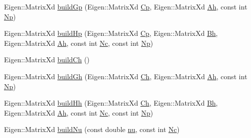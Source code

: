 \begin{DoxyCompactItemize}
\item 
\-Eigen\-::\-Matrix\-Xd \hyperlink{classZmpPreviewController_a6b61c5f7bcda6b8df027771a8e43ea8b}{build\-Gp} (\-Eigen\-::\-Matrix\-Xd \hyperlink{classZmpPreviewController_a1a63870dcc3d51a26c4adc9c97e650ff}{\-Cp}, \-Eigen\-::\-Matrix\-Xd \hyperlink{classZmpPreviewController_a8ee8ec415e25374f4fa687f5a5a6b9df}{\-Ah}, const int \hyperlink{classZmpPreviewController_a2de373daf73b4c28f4b6387787bd27e2}{\-Np})
\item 
\-Eigen\-::\-Matrix\-Xd \hyperlink{classZmpPreviewController_a32aeeb35ac5733702fba52df05fdf61d}{build\-Hp} (\-Eigen\-::\-Matrix\-Xd \hyperlink{classZmpPreviewController_a1a63870dcc3d51a26c4adc9c97e650ff}{\-Cp}, \-Eigen\-::\-Matrix\-Xd \hyperlink{classZmpPreviewController_a98bd07d03d0a6004b345ef4310cf17b6}{\-Bh}, \-Eigen\-::\-Matrix\-Xd \hyperlink{classZmpPreviewController_a8ee8ec415e25374f4fa687f5a5a6b9df}{\-Ah}, const int \hyperlink{classZmpPreviewController_af0c8b4aa92a6e3e95f80d81a8c91f693}{\-Nc}, const int \hyperlink{classZmpPreviewController_a2de373daf73b4c28f4b6387787bd27e2}{\-Np})
\item 
\-Eigen\-::\-Matrix\-Xd \hyperlink{classZmpPreviewController_a58723464a66fc3a1122c613500bb2052}{build\-Ch} ()
\item 
\-Eigen\-::\-Matrix\-Xd \hyperlink{classZmpPreviewController_a877b1d91bdf6767d8be83ef2a67fedde}{build\-Gh} (\-Eigen\-::\-Matrix\-Xd \hyperlink{classZmpPreviewController_a2093754713ffb2a7adcd1310c73bf775}{\-Ch}, \-Eigen\-::\-Matrix\-Xd \hyperlink{classZmpPreviewController_a8ee8ec415e25374f4fa687f5a5a6b9df}{\-Ah}, const int \hyperlink{classZmpPreviewController_a2de373daf73b4c28f4b6387787bd27e2}{\-Np})
\item 
\-Eigen\-::\-Matrix\-Xd \hyperlink{classZmpPreviewController_ac28b93f8e76b4bd00d418f80c330bb67}{build\-Hh} (\-Eigen\-::\-Matrix\-Xd \hyperlink{classZmpPreviewController_a2093754713ffb2a7adcd1310c73bf775}{\-Ch}, \-Eigen\-::\-Matrix\-Xd \hyperlink{classZmpPreviewController_a98bd07d03d0a6004b345ef4310cf17b6}{\-Bh}, \-Eigen\-::\-Matrix\-Xd \hyperlink{classZmpPreviewController_a8ee8ec415e25374f4fa687f5a5a6b9df}{\-Ah}, const int \hyperlink{classZmpPreviewController_af0c8b4aa92a6e3e95f80d81a8c91f693}{\-Nc}, const int \hyperlink{classZmpPreviewController_a2de373daf73b4c28f4b6387787bd27e2}{\-Np})
\item 
\-Eigen\-::\-Matrix\-Xd \hyperlink{classZmpPreviewController_ad1322ec975c7d022feb24a40fff62f2e}{build\-Nu} (const double \hyperlink{classZmpPreviewController_ac611f084023404faba1ccfab573cd81d}{nu}, const int \hyperlink{classZmpPreviewController_af0c8b4aa92a6e3e95f80d81a8c91f693}{\-Nc})

\end{DoxyCompactItemize}
